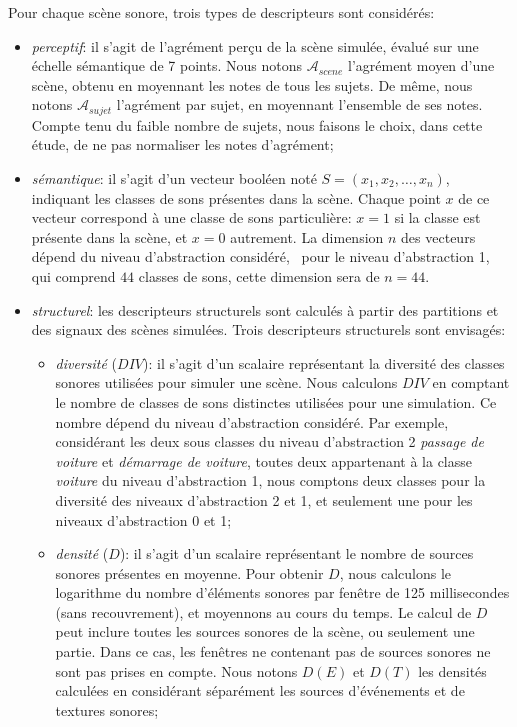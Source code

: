 Pour chaque scène sonore, trois types de descripteurs sont considérés:

\begin{itemize}
\item \emph{perceptif}: il s'agit de l'agrément perçu de la scène simulée, évalué sur une échelle sémantique de 7 points. Nous notons $\mathcal{A}_{scene}$ l'agrément moyen d'une scène, obtenu en moyennant les notes de tous les sujets. De même, nous notons  $\mathcal{A}_{sujet}$ l'agrément par sujet, en moyennant l'ensemble de ses notes. Compte tenu du faible nombre de sujets, nous faisons le choix, dans cette étude, de ne pas normaliser les notes d'agrément;
\item \emph{sémantique}: il s'agit d'un vecteur booléen noté $S=(x_1,x_2,\ldots,x_n)$, indiquant les classes de sons présentes dans la scène. Chaque point $x$ de ce vecteur correspond à une classe de sons particulière: $x=1$ si la classe est présente dans la scène, et $x=0$ autrement. La dimension $n$ des vecteurs dépend du niveau d'abstraction considéré, \eg~pour le niveau d'abstraction 1, qui comprend $44$ classes de sons, cette dimension sera de $n=44$.
\item \emph{structurel}: les descripteurs structurels sont calculés à partir des partitions et des signaux des scènes simulées. Trois descripteurs structurels sont envisagés:
\begin{itemize}
\item \emph{diversité} ($DIV$): il s'agit d'un scalaire représentant la diversité des classes sonores utilisées pour simuler une scène. Nous calculons $DIV$ en comptant le nombre de classes de sons distinctes utilisées pour une simulation. Ce nombre dépend du niveau d'abstraction considéré. Par exemple, considérant les deux sous classes du niveau d'abstraction 2 \emph{passage de voiture} et \emph{démarrage de voiture}, toutes deux appartenant à la classe \emph{voiture} du niveau d'abstraction 1, nous comptons deux classes pour la diversité des niveaux d'abstraction 2 et 1, et seulement une pour les niveaux d'abstraction 0 et 1;
\item \emph{densité} ($D$): il s'agit d'un scalaire représentant le nombre de sources sonores présentes en moyenne. Pour obtenir $D$, nous calculons le logarithme du nombre d'éléments sonores par fenêtre de 125 millisecondes (sans recouvrement), et moyennons au cours du temps. Le calcul de $D$ peut inclure toutes les sources sonores de la scène, ou seulement une partie. Dans ce cas, les fenêtres ne contenant pas de sources sonores ne sont pas prises en compte. Nous notons $D(E)$ et $D(T)$ les densités calculées en considérant séparément les sources d'événements et de textures sonores;

\end{itemize}
\end{itemize}
